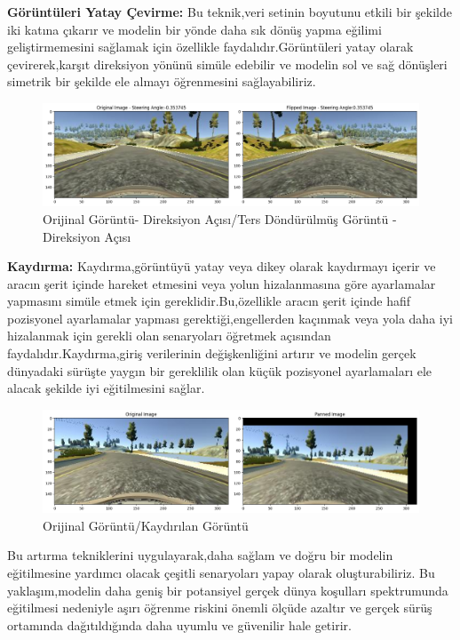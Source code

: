 \documentclass{article}
\begin{document}
\textbf {\noindent Görüntüleri Yatay Çevirme:} Bu teknik,veri setinin boyutunu etkili bir şekilde iki katına çıkarır ve modelin bir yönde daha sık dönüş yapma eğilimi geliştirmemesini sağlamak için özellikle faydalıdır.Görüntüleri yatay olarak çevirerek,karşıt direksiyon yönünü simüle edebilir ve modelin sol ve sağ dönüşleri simetrik bir şekilde ele almayı öğrenmesini sağlayabiliriz. \\
\begin{figure}[h]
  \centering
  \includegraphics[width=1\textwidth]{image/3..png} %
\caption{Orijinal Görüntü- Direksiyon Açısı/Ters Döndürülmüş Görüntü - Direksiyon Açısı}
  \label{fig:cnnmimari}  
\end{figure}

\textbf {Kaydırma:} Kaydırma,görüntüyü yatay veya dikey olarak kaydırmayı içerir ve aracın şerit içinde hareket etmesini veya yolun hizalanmasına göre ayarlamalar yapmasını simüle etmek için gereklidir.Bu,özellikle aracın şerit içinde hafif pozisyonel ayarlamalar yapması gerektiği,engellerden kaçınmak veya yola daha iyi hizalanmak için gerekli olan senaryoları öğretmek açısından faydalıdır.Kaydırma,giriş verilerinin değişkenliğini artırır ve modelin gerçek dünyadaki sürüşte yaygın bir gereklilik olan küçük pozisyonel ayarlamaları ele alacak şekilde iyi eğitilmesini sağlar. \\

\begin{figure}[h]
  \centering
  \includegraphics[width=1\textwidth]{image/4..png} %
\caption{Orijinal Görüntü/Kaydırılan Görüntü}
  \label{fig:cnnmimari}  
\end{figure}

Bu artırma tekniklerini uygulayarak,daha sağlam ve doğru bir modelin eğitilmesine yardımcı olacak çeşitli senaryoları yapay olarak oluşturabiliriz. Bu yaklaşım,modelin daha geniş bir potansiyel gerçek dünya koşulları spektrumunda eğitilmesi nedeniyle aşırı öğrenme riskini önemli ölçüde azaltır ve gerçek sürüş ortamında dağıtıldığında daha uyumlu ve güvenilir hale getirir.
\end{document}
